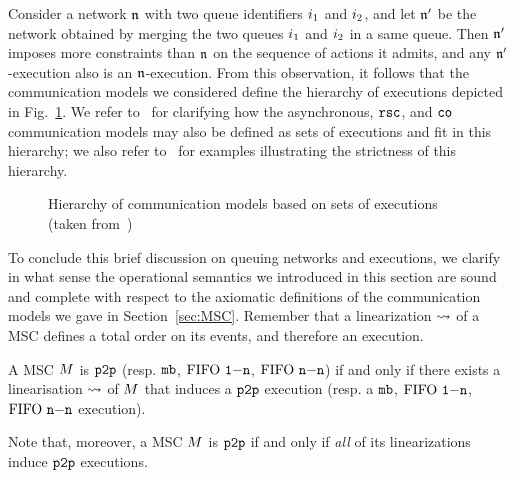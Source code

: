 Consider a network $\mathfrak{n}$ with two queue identifiers $i_1$ and $i_2$,
and let $\mathfrak{n}'$ be the network obtained by merging the two queues $i_1$ and $i_2$ in a
same queue. Then $\mathfrak{n}'$ imposes more constraints than $\mathfrak{n}$ on the sequence of actions it admits,
and any $\mathfrak{n}'$-execution also is an $\mathfrak{n}$-execution. From this observation, it follows that
the communication models we considered define the hierarchy of executions depicted in
Fig.~\ref{fig:hierarchy-of-executions}. We refer
to~\cite{DBLP:journals/fac/ChevrouHQ16}
for clarifying how the asynchronous, $\mathtt{rsc}$, and $\mathtt{co}$ communication models may
also be defined as sets of executions and fit in this hierarchy; we also refer
to~\cite{DBLP:journals/fac/ChevrouHQ16} for examples illustrating
the strictness of this hierarchy.

\begin{figure}
    
    \caption{\label{fig:hierarchy-of-executions} Hierarchy of communication models based on  sets of
    executions (taken from~\cite{DBLP:journals/fac/ChevrouHQ16})}
\end{figure}

To conclude this brief discussion on queuing networks and executions, we clarify in what sense the operational semantics we introduced in this section are sound and complete with respect to the axiomatic definitions of the communication models we gave in Section~\ref{sec:MSC}. Remember that a linearization $\rightsquigarrow$ of a MSC
defines a total order on its events, and therefore an execution.

\begin{theorem}
A MSC $M$ is $\mathtt{p2p}$ (resp. $\mathtt{mb}$, $\text{FIFO } \mathtt{1\mathsf{-}n}$, $\text{FIFO } \mathtt{n\mathsf{-}n}$) if and only if there exists
a linearisation $\rightsquigarrow$ of $M$ that induces a $\mathtt{p2p}$ execution (resp. a $\mathtt{mb}$, $\text{FIFO } \mathtt{1\mathsf{-}n}$, $\text{FIFO } \mathtt{n\mathsf{-}n}$ execution).
\end{theorem}

Note that, moreover, a MSC $M$ is $\mathtt{p2p}$ if and only if \emph{all} of its linearizations induce $\mathtt{p2p}$ executions.
